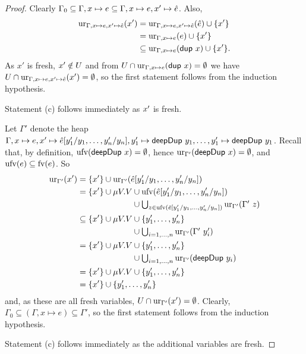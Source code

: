 \documentclass[preprint]{sigplanconf}
\theoremstyle{nonumberplain}
\newtheorem{proof}{Proof}
\begin{document}
\begin{proof}
Clearly $\Gamma_0 \subseteq \Gamma, x\mapsto e \subseteq \Gamma, x\mapsto e, x' \mapsto \hat e$. Also,
\begin{align*}
\text{ur}_{\Gamma,x\mapsto e, x'\mapsto \hat e}(x')
&= \text{ur}_{\Gamma, x\mapsto e, x'\mapsto \hat e}(\hat e) \cup \{x'\}\\
&= \text{ur}_{\Gamma, x\mapsto e}(e) \cup \{x'\}\\
&\subseteq \text{ur}_{\Gamma, x\mapsto e}(\text{\textsf{dup}}\ x) \cup \{x'\}.
\end{align*}
As $x'$ is fresh, $x'\notin U$ and from $U \cap \text{ur}_{\Gamma, x\mapsto e}(\text{\textsf{dup}}\ x)= \emptyset$ we have $U \cap \text{ur}_{\Gamma,x\mapsto e, x' \mapsto \hat e}(x')=\emptyset$, so the first statement follows from the induction hypothesis.

Statement (c) follows immediately as $x'$ is fresh.

Let $\Gamma'$ denote the heap $\Gamma, x\mapsto e, x'\mapsto \hat e[y'_1/y_1,\ldots,y'_n/y_n],\allowbreak y'_1 \mapsto \text{\textsf{deepDup}}\ y_1,\allowbreak \ldots,\allowbreak y'_1 \mapsto \text{\textsf{deepDup}}\ y_1$.
Recall that, by definition, $\text{ufv}(\text{\textsf{deepDup}}\ x)=\emptyset$, hence $\text{ur}_{\Gamma'}(\text{\textsf{deepDup}}\ x) = \emptyset$, and $\text{ufv}(e) \subseteq \text{fv}(e)$. So 
\begin{align*}
\text{ur}_{\Gamma'}(x')
&= \{x'\} \cup \text{ur}_{\Gamma'}(\hat e[y'_1/y_1,\ldots,y'_n/y_n]) \\
&= \{x'\} \cup \mu V. V
\begin{aligned}[t]
&\cup \text{ufv}(\hat e[y'_1/y_1,\ldots,y'_n/y_n])\\
&\cup \textstyle\bigcup_{z \in \text{ufv}(\hat e[y'_1/y_1,\ldots,y'_n/y_n])} \text{ur}_{\Gamma'}(\Gamma' \ z)
\end{aligned}\\
&\subseteq \{x'\} \cup \mu V. V
\begin{aligned}[t]
&\cup \{y'_1,\ldots, y'_n\}\\
&\cup \textstyle\bigcup_{i=1,\ldots,n} \text{ur}_{\Gamma'}(\Gamma'\ y'_i)
\end{aligned}\\
&= \{x'\} \cup \mu V. V
\begin{aligned}[t]
&\cup \{y'_1,\ldots, y'_n\}\\
&\cup \textstyle\bigcup_{i=1,\ldots,n} \text{ur}_{\Gamma'}(\text{\textsf{deepDup}}\ y_i)
\end{aligned}\\
&= \{x'\} \cup \mu V. V \cup \{y'_1,\ldots, y'_n\} \\
&= \{x'\} \cup \{y'_1,\ldots, y'_n\}
\end{align*}
and, as these are all fresh variables, $U \cap \text{ur}_{\Gamma'}(x') = \emptyset$. Clearly, $\Gamma_0 \subseteq (\Gamma, x\mapsto e) \subseteq \Gamma'$, so the  first statement follows from the induction hypothesis.

Statement (c) follows immediately as the additional variables are fresh.
\end{proof}
\end{document}

